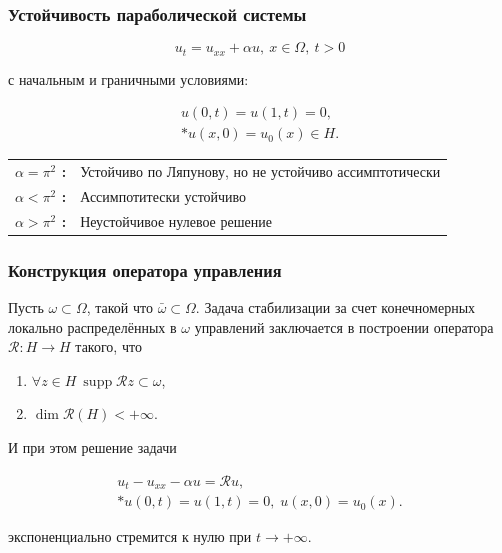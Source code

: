 \documentclass{beamer}
\newcommand{\operator}[1]{\mathcal{R}{#1}}
\newcommand{\supp}{\mathop{\mathrm{supp}}}
\begin{document}
\begin{frame}
    \frametitle{Устойчивость параболической системы}

    \begin{block}{}
        \begin{equation}\label{dif_form}
            u_t = u_{xx} + \alpha u, \ x \in \Omega, \ t > 0
        \end{equation}
    \end{block}
    с начальным и граничными условиями:
    \begin{block}{}
        \begin{gather}\label{d_control}
            u(0, t) = u(1, t) = 0, \\*
            u(x, 0) = u_{0}(x) \in H. \nonumber
        \end{gather}
    \end{block}

    \begin{tabular}{@{\textbullet~}l@{\ }p{3in}}
        \bfseries $\alpha = \pi^2$ : & Устойчиво по Ляпунову, но не устойчиво ассимптотически \\
        \bfseries $\alpha < \pi^2$ : & Ассимпотитески устойчиво \\
        \bfseries $\alpha > \pi^2$ : & Неустойчивое нулевое решение
    \end{tabular}

\end{frame}

\begin{frame}
    \frametitle{Конструкция оператора управления}

    \hspace{5mm}Пусть $\omega \subset \Omega$, такой что $\bar{\omega} \subset
    \Omega$. Задача стабилизации за счет конечномерных локально распределённых в 
    $\omega$ управлений заключается в построении оператора 
    $\mathcal{R} : H \rightarrow H$ такого, что
    \begin{enumerate}
        \item $\forall z \in H \ \supp \operator{z} \subset \omega$,
        \item $\dim \operator{(H)} < +\infty$.
    \end{enumerate}
    И при этом решение задачи 
    \begin{block}{}
        \begin{gather}
            u_t - u_{xx} - \alpha u = \mathcal{R}u, \\*
            u(0, t) = u(1, t) = 0, \; u(x, 0) = u_{0}(x).
        \end{gather}
    \end{block}
    экспоненциально стремится к нулю при $t \rightarrow + \infty$.
\end{frame}
\end{document}
